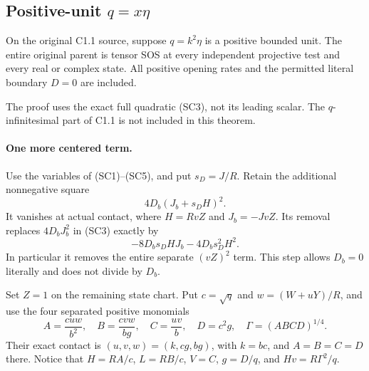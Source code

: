 \subsection{Positive-unit $q=x\eta$}

\label{component:p95350f69a353}

\label{p95350f69a353:sec:r7-c1-q-unit}
\begin{theorem}
On the original C1.1 source, suppose $q=k^2\eta$ is a positive bounded
unit. The entire original parent is tensor SOS at every independent
projective test and every real or complex state. All positive opening
rates and the permitted literal boundary $D=0$ are included.
\end{theorem}
The proof uses the exact full quadratic (SC3), not its leading scalar.
The $q$-infinitesimal part of C1.1 is not included in this theorem.

\paragraph{One more centered term.}
Use the variables of (SC1)--(SC5), and put $s_D=J/R$. Retain the
additional nonnegative square
\[
                  4D_b(J_b+s_DH)^2.                 \tag{SC10}
\]
It vanishes at actual contact, where $H=RvZ$ and $J_b=-JvZ$.
Its removal replaces $4D_bJ_b^2$ in (SC3) exactly by
\[
                  -8D_bs_DHJ_b-4D_bs_D^2H^2.
\]
In particular it removes the entire separate $(vZ)^2$ term.
This step allows $D_b=0$ literally and does not divide by $D_b$.

Set $Z=1$ on the remaining state chart. Put $c=\sqrt q$ and
$w=(W+uY)/R$, and use the four separated positive monomials
\[
 A=\frac{cuw}{b^2},\quad B=\frac{cvw}{bg},\quad
 C=\frac{uv}{b},\quad D=c^2g,\quad
 \Gamma=(ABCD)^{1/4}.
 \tag{SC11}
\]
Their exact contact is $(u,v,w)=(k,cg,bg)$, with $k=bc$, and
$A=B=C=D$ there. Notice that $H=RA/c$, $L=RB/c$, $V=C$,
$g=D/q$, and $Hv=R\Gamma^2/q$.

